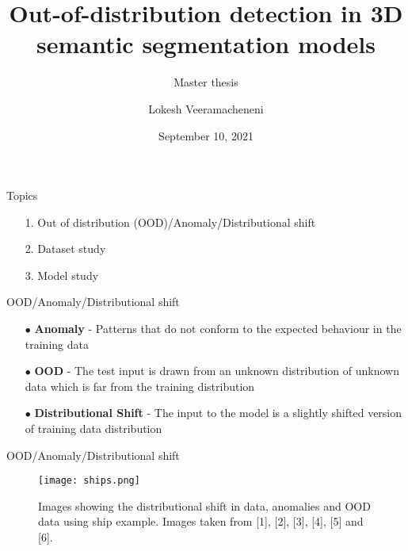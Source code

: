 \documentclass[aspectratio=169]{beamer}
\author[]{Lokesh Veeramacheneni}
\title{Out-of-distribution detection in 3D semantic segmentation models}
\subtitle{Master thesis}
\institute[HBRS]{Hochschule Bonn-Rhein-Sieg}
\date{September 10, 2021}
\begin{document}
{
\begin{frame}
\titlepage
\end{frame}
}
\begin{frame}{Topics}
    \begin{itemize}
        \item[1.] Out of distribution (OOD)/Anomaly/Distributional shift
        \item[2.] Dataset study
        \item[3.] Model study
    \end{itemize}
\end{frame}

\begin{frame}{OOD/Anomaly/Distributional shift}
    \begin{itemize}
        \item[$\bullet$] \textbf{Anomaly} - Patterns that do not conform to the expected behaviour in the training
        data
        \item[$\bullet$] \textbf{OOD} - The test input is drawn from an unknown distribution of unknown data
        which is far from the training distribution
        \item[$\bullet$] \textbf{Distributional Shift} - The input to the model is a slightly shifted version of training data distribution
    \end{itemize}
    
\end{frame}

\begin{frame}{OOD/Anomaly/Distributional shift}
    \begin{figure}
        \centering
        \caption{Images showing the distributional shift in data, anomalies and OOD data using ship example. Images taken from [1], [2], [3], [4], [5] and [6].}
        \texttt{[image: ships.png]}
    \end{figure}
\end{frame}
\end{document}
